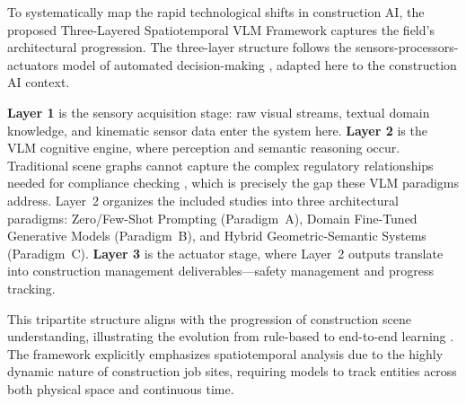 \documentclass[10pt,letterpaper]{article}
\begin{document}
To systematically map the rapid technological shifts in construction AI, the proposed Three-Layered Spatiotemporal VLM Framework captures the field's architectural progression. The three-layer structure follows the sensors-processors-actuators model of automated decision-making \cite{parasuraman2000}, adapted here to the construction AI context.

\textbf{Layer 1} is the sensory acquisition stage: raw visual streams, textual domain knowledge, and kinematic sensor data enter the system here. \textbf{Layer 2} is the VLM cognitive engine, where perception and semantic reasoning occur. Traditional scene graphs cannot capture the complex regulatory relationships needed for compliance checking \cite{wang2023}, which is precisely the gap these VLM paradigms address. Layer~2 organizes the included studies into three architectural paradigms: Zero/Few-Shot Prompting (Paradigm~A), Domain Fine-Tuned Generative Models (Paradigm~B), and Hybrid Geometric-Semantic Systems (Paradigm~C). \textbf{Layer 3} is the actuator stage, where Layer~2 outputs translate into construction management deliverables---safety management and progress tracking.

This tripartite structure aligns with the progression of construction scene understanding, illustrating the evolution from rule-based to end-to-end learning \cite{li2025}. The framework explicitly emphasizes spatiotemporal analysis due to the highly dynamic nature of construction job sites, requiring models to track entities across both physical space and continuous time.
\end{document}
